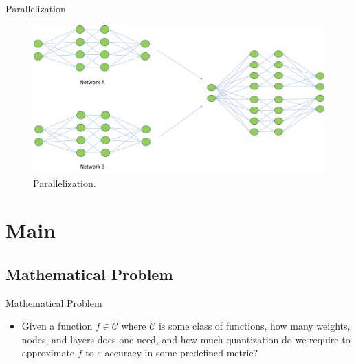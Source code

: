 \documentclass{if-beamer}
\begin{document}
\begin{frame}{Parallelization}
    \begin{figure}[htbp]
        \includegraphics[width=1\textwidth]{parallelization.png}
        \caption{ Parallelization. }
        \label{fig:figure1}
    \end{figure}
\end{frame}

\section{Main}

\subsection{Mathematical Problem}
\begin{frame}{Mathematical Problem}
\begin{itemize}
    \item Given a function $f \in \mathcal{C}$ where $\mathcal{C}$ is some class of functions, how many weights, nodes, and layers does one need, and how much quantization do we require to approximate $f$ to $\varepsilon$ accuracy in some predefined metric?
\end{itemize}
\end{frame}
\end{document}
